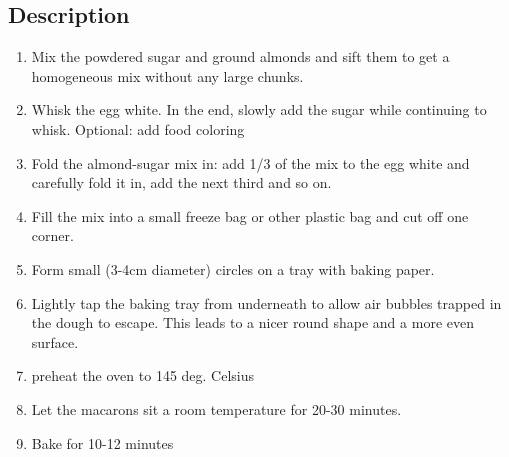 \subsection*{Description}
\begin{enumerate}
	\item Mix the powdered sugar and ground almonds and sift them to get a homogeneous mix without any large chunks.
	\item Whisk the egg white. In the end, slowly add the sugar while continuing to whisk. Optional: add food coloring
	\item Fold the almond-sugar mix in: add 1/3 of the mix to the egg white and carefully fold it in, add the next third and so on.
	\item Fill the mix into a small freeze bag or other plastic bag and cut off one corner.
	\item Form small (3-4cm diameter) circles on a tray with baking paper.
	\item Lightly tap the baking tray from underneath to allow air bubbles trapped in the dough to escape. This leads to a nicer round shape and a more even surface.
	\item preheat the oven to 145 deg. Celsius
	\item Let the macarons sit a room temperature for 20-30 minutes.
	\item Bake for 10-12 minutes
\end{enumerate}

